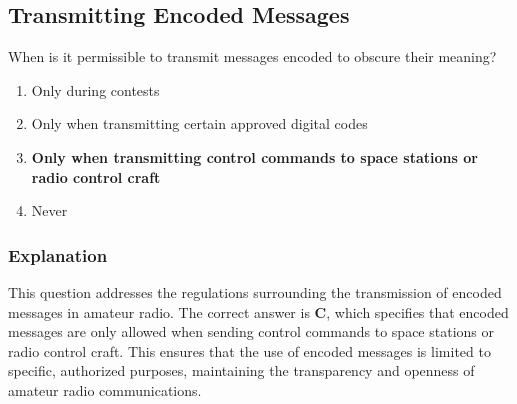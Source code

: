 \subsection{Transmitting Encoded Messages}
\label{T1D03}

\begin{tcolorbox}[colback=gray!10!white,colframe=black!75!black,title=T1D03]
When is it permissible to transmit messages encoded to obscure their meaning?
\begin{enumerate}[label=\Alph*),noitemsep]
    \item Only during contests
    \item Only when transmitting certain approved digital codes
    \item \textbf{Only when transmitting control commands to space stations or radio control craft}
    \item Never
\end{enumerate}
\end{tcolorbox}

\subsubsection*{Explanation}
This question addresses the regulations surrounding the transmission of encoded messages in amateur radio. The correct answer is \textbf{C}, which specifies that encoded messages are only allowed when sending control commands to space stations or radio control craft. This ensures that the use of encoded messages is limited to specific, authorized purposes, maintaining the transparency and openness of amateur radio communications.